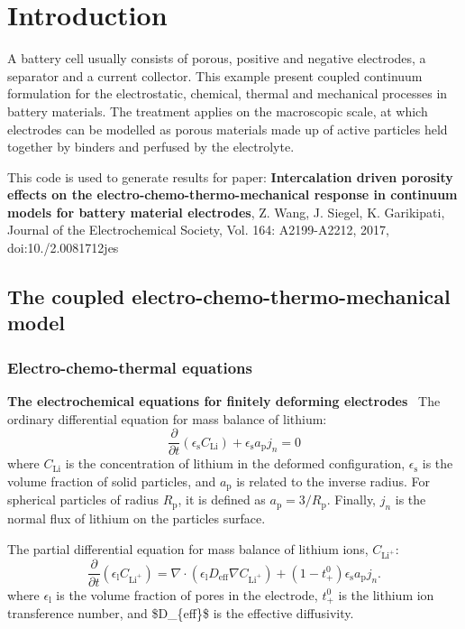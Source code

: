 \hypertarget{_intercalation_Introduction}{}\section{Introduction}\label{_intercalation_Introduction}
A battery cell usually consists of porous, positive and negative electrodes, a separator and a current collector. This example present coupled continuum formulation for the electrostatic, chemical, thermal and mechanical processes in battery materials. The treatment applies on the macroscopic scale, at which electrodes can be modelled as porous materials made up of active particles held together by binders and perfused by the electrolyte.

This code is used to generate results for paper\+: {\bfseries Intercalation driven porosity effects on the electro-\/chemo-\/thermo-\/mechanical response in continuum models for battery material electrodes}, Z. Wang, J. Siegel, K. Garikipati, Journal of the Electrochemical Society, Vol. 164\+: A2199-\/\+A2212, 2017, doi\+:10./2.0081712jes  \hypertarget{battery_particle_section1}{}\subsection{The coupled electro-\/chemo-\/thermo-\/mechanical model}\label{battery_particle_section1}
\hypertarget{battery_particle_subsub1}{}\subsubsection{Electro-\/chemo-\/thermal equations}\label{battery_particle_subsub1}
{\bfseries The electrochemical equations for finitely deforming electrodes}~\newline
 The ordinary differential equation for mass balance of lithium\+: \[ \frac{\partial}{\partial t}({\epsilon_\text{s}C_\text{Li}})+\epsilon_\text{s}{a_\text{p}}j_n=0 \] where $C_\text{Li}$ is the concentration of lithium in the deformed configuration, $\epsilon_\text{s}$ is the volume fraction of solid particles, and $a_\text{p}$ is related to the inverse radius. For spherical particles of radius $R_\text{p}$, it is defined as $a_\text{p} = 3/R_\text{p}$. Finally, $j_n$ is the normal flux of lithium on the particle\textquotesingle{}s surface.

The partial differential equation for mass balance of lithium ions, $C_{\text{Li}^+}$\+: \[ \frac{\partial }{\partial t}(\epsilon_\text{l}C_{\text{Li}^+})=\nabla\cdot (\epsilon_\text{l}D_\text{eff}\nabla C_{\text{Li}^+})+(1-t^0_+)\epsilon_\text{s}{a_\text{p}}j_n. \] where $\epsilon_\text{l}$ is the volume fraction of pores in the electrode, $t^0_+$ is the lithium ion transference number, and \$\+D\+\_\+\{eff\}\$ is the effective diffusivity.

